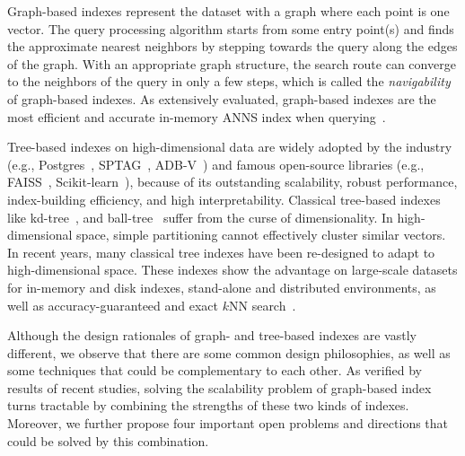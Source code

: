 \documentclass[11pt]{article}
\begin{document}
Graph-based indexes represent the dataset with a graph where each point is one vector.
The query processing algorithm starts from some entry point(s) and finds the approximate nearest neighbors by stepping towards the query along the edges of the graph.
With an appropriate graph structure, the search route can converge to the neighbors of the query in only a few steps, which is called the \emph{navigability} of graph-based indexes.
As extensively evaluated, graph-based indexes are the most efficient and accurate in-memory ANNS index when querying~\cite{wang-survey}.

Tree-based indexes on high-dimensional data are widely adopted by the industry (e.g., Postgres~\cite{postgres}, SPTAG~\cite{sptag}, ADB-V~\cite{adbv}) and famous open-source libraries (e.g., FAISS~\cite{faiss}, Scikit-learn~\cite{scikit-leran}), because of its outstanding scalability, robust performance, index-building efficiency, and high interpretability.
Classical tree-based indexes like kd-tree~\cite{kd-tree}, and ball-tree~\cite{ball-tree} suffer from the curse of dimensionality.
In high-dimensional space, simple partitioning cannot effectively cluster similar vectors.
In recent years, many classical tree indexes have been re-designed to adapt to high-dimensional space.
These indexes show the advantage on large-scale datasets for in-memory and disk indexes, stand-alone and distributed environments, as well as accuracy-guaranteed and exact $k$NN search~\cite{hydra2,elpis,spann}.

Although the design rationales of graph- and tree-based indexes are vastly different, we observe that there are some common design philosophies, as well as some techniques that could be complementary to each other.
As verified by results of recent studies, solving the scalability problem of graph-based index turns tractable by combining the strengths of these two kinds of indexes.
Moreover, we further propose four important open problems and directions that could be solved by this combination.
\end{document}
